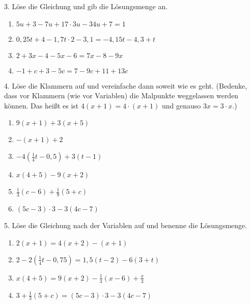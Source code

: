 \documentclass[11pt,a4paper]{scrartcl}
\begin{document}
3. Löse die Gleichung und gib die Lösungsmenge an.
\begin{multicols}{2}
	\begin{enumerate}[label=\alph*)] 
		\item $5u+3-7u+17\cdot 3u - 34u+7 = 1$
		\item $0,25t+4-1,7t\cdot 2 -3,1 = -4,15t-4,3+t$
		\item $2+3x-4-5x-6=7x-8-9x$
		\item $-1+c+3-5c=7-9c+11+13c$
	\end{enumerate}
\end{multicols}

4. Löse die Klammern auf und vereinfache dann soweit wie es geht. (Bedenke, dass vor Klammern (wie vor Variablen) die Malpunkte weggelassen werden können. Das heißt es ist $4(x+1) = 4\cdot (x+1)$ und genauso $3x = 3\cdot x$.)
\begin{multicols}{3}
	\begin{enumerate}[label=\alph*)] 
		\item $9(x+1)+3(x+5)$ \item $-(x+1)+2$ \item $-4(\frac{1}{4}t-0,5)+3(t-1) $
		\item $x(4+5)-9(x+2)$ \item $\frac{1}{3}(c-6)+\frac{1}{9}(5+c)$ \item $(5c-3)\cdot 3 - 3 (4c-7)$
	\end{enumerate}
\end{multicols}

5. Löse die Gleichung nach der Variablen auf und benenne die Lösungsmenge.
\begin{multicols}{2}
	\begin{enumerate}[label=\alph*)] 
		\item $2(x+1)=4(x+2)-(x+1)$ \item $2-2(\frac{1}{4}t-0,75)=1,5(t-2)-6(3+t) $
		\item$x(4+5)=9(x+2)-\frac{1}{3}(x-6)+\frac{x}{3}$\item $3+\frac{1}{3}(5+c)=(5c-3)\cdot 3 - 3 (4c-7)$
	\end{enumerate}
\end{multicols}

\newpage 
\end{document}

